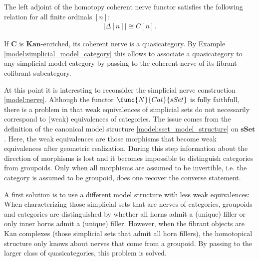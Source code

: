     \begin{property}
        The left adjoint of the homotopy coherent nerve functor satisfies the following relation for all finite ordinals $[n]$:
        \begin{gather}
            |\Delta[n]|\cong C[n].
        \end{gather}
    \end{property}

    \begin{property}[Quasicategories]
        If $\mathbf{C}$ is $\mathbf{Kan}$-enriched, its coherent nerve is a quasicategory. By Example \ref{model:simplicial_model_category} this allows to associate a quasicategory to any simplicial model category by passing to the coherent nerve of its fibrant-cofibrant subcategory.
    \end{property}

    At this point it is interesting to reconsider the simplicial nerve construction \ref{model:nerve}. Although the functor $\func{N}{Cat}{sSet}$ is fully faithfull, there is a problem in that weak equivalences of simplicial sets do not necessarily correspond to (weak) equivalences of categories. The issue comes from the definition of the canonical model structure \ref{model:sset_model_structure} on $\mathbf{sSet}$. Here, the weak equivalences are those morphisms that become weak equivalences after geometric realization. During this step information about the direction of morphisms is lost and it becomes impossible to distinguish categories from groupoids. Only when all morphisms are assumed to be invertible, i.e. the category is assumed to be groupoid, does one recover the converse statement.

    A first solution is to use a different model structure with less weak equivalences:
    When characterizing those simplicial sets that are nerves of categories, groupoids and categories are distinguished by whether all horns admit a (unique) filler or only inner horns admit a (unique) filler. However, when the fibrant objects are Kan complexes (those simplicial sets that admit all horn fillers), the homotopical structure only knows about nerves that come from a groupoid. By passing to the larger class of quasicategories, this problem is solved.

